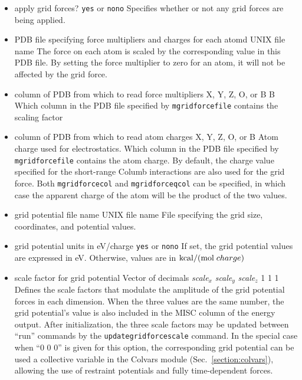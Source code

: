 \begin{itemize}

\item
{}
{apply grid forces?}
{{\tt yes} or {\tt no}}{{\tt no}}
{Specifies whether or not any grid forces are being applied.}

\item
{}
{PDB file specifying force multipliers and charges for each atomd}
{UNIX file name}
{The force on each atom is scaled by the corresponding value in this PDB file. By setting the force multiplier to zero for an atom, it will not be affected by the grid force. }

\item
{}
{column of PDB from which to read force multipliers}
{X, Y, Z, O, or B}
{B}
{Which column in the PDB file specified by {\tt mgridforcefile} contains the scaling factor}

\item
{}
{column of PDB from which to read atom charges}
{X, Y, Z, O, or B}
{Atom charge used for electrostatics.} 
{Which column in the PDB file specified by {\tt mgridforcefile} contains the atom charge. By default, the charge value specified for the short-range Columb interactions are also used for the grid force. Both {\tt mgridforcecol} and {\tt mgridforceqcol} can be specified, in which case the apparent charge of the atom will be the product of the two values.}

\item
{}
{grid potential file name}
{UNIX file name}
{File specifying the grid size, coordinates, and potential values.}

\item
{}
{grid potential units in eV/charge}
{{\tt yes} or {\tt no}}{{\tt no}}
{If set, the grid potential values are expressed in {\rm eV}. Otherwise, values are
in ${\rm kcal} / ({\rm mol} \; charge)$}

\item
{}
{scale factor for grid potential}
{Vector of decimals {\it scale}$_x$ {\it scale}$_y$ {\it scale}$_z$ }
{1 1 1}
{Defines the scale factors that modulate the amplitude of the grid potential forces in each dimension.
  When the three values are the same number, the grid potential's value is also included in the MISC column of the energy output.
  After initialization, the three scale factors may be updated between ``run'' commands by the {\tt updategridforcescale} command.
  In the special case when ``0 0 0'' is given for this option, the corresponding grid potential can be used a collective variable in the Colvars module (Sec.~\ref{section:colvars}), allowing the use of restraint potentials and fully time-dependent forces.}


\end{itemize}
